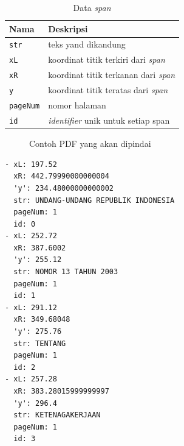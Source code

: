 \begin{table}
  \centering
  \begin{tabular}{|l|l|} \hline
    Nama             & Deskripsi                                   \\\hline \hline
    \texttt{str}     & teks yand dikandung                         \\\hline
    \texttt{xL}      & koordinat titik terkiri dari \textit{span}  \\\hline
    \texttt{xR}      & koordinat titik terkanan dari \textit{span} \\\hline
    \texttt{y}       & koordinat titik teratas dari \textit{span}  \\\hline
    \texttt{pageNum} & nomor halaman                               \\\hline
    \texttt{id}      & \textit{identifier} unik untuk setiap span  \\\hline
  \end{tabular}
  \caption{Data \textit{span}}
  \label{tab:data-span}
\end{table}

\begin{figure}[H]
  \centering
  \caption{Contoh PDF yang akan dipindai}
  \label{fig:contoh-dokumen}
\end{figure}

\begin{listing}[H]
  \begin{verbatim}
- xL: 197.52
  xR: 442.79990000000004
  'y': 234.48000000000002
  str: UNDANG-UNDANG REPUBLIK INDONESIA
  pageNum: 1
  id: 0
- xL: 252.72
  xR: 387.6002
  'y': 255.12
  str: NOMOR 13 TAHUN 2003
  pageNum: 1
  id: 1
- xL: 291.12
  xR: 349.68048
  'y': 275.76
  str: TENTANG
  pageNum: 1
  id: 2
- xL: 257.28
  xR: 383.28015999999997
  'y': 296.4
  str: KETENAGAKERJAAN
  pageNum: 1
  id: 3
  \end{verbatim}
  \caption{Hasil pemindaian \pic~\ref{fig:contoh-dokumen} dalam format yaml}
  \label{lst:hasil-pemindaian}
\end{listing}

